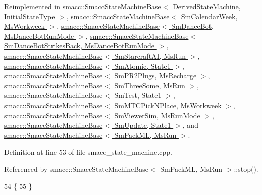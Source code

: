 Reimplemented in \hyperlink{structsmacc_1_1SmaccStateMachineBase_aaa9baa888888165998aa990ca299e30b}{smacc\+::\+Smacc\+State\+Machine\+Base$<$ Derived\+State\+Machine, Initial\+State\+Type $>$}, \hyperlink{structsmacc_1_1SmaccStateMachineBase_aaa9baa888888165998aa990ca299e30b}{smacc\+::\+Smacc\+State\+Machine\+Base$<$ Sm\+Calendar\+Week, Ms\+Workweek $>$}, \hyperlink{structsmacc_1_1SmaccStateMachineBase_aaa9baa888888165998aa990ca299e30b}{smacc\+::\+Smacc\+State\+Machine\+Base$<$ Sm\+Dance\+Bot, Ms\+Dance\+Bot\+Run\+Mode $>$}, \hyperlink{structsmacc_1_1SmaccStateMachineBase_aaa9baa888888165998aa990ca299e30b}{smacc\+::\+Smacc\+State\+Machine\+Base$<$ Sm\+Dance\+Bot\+Strikes\+Back, Ms\+Dance\+Bot\+Run\+Mode $>$}, \hyperlink{structsmacc_1_1SmaccStateMachineBase_aaa9baa888888165998aa990ca299e30b}{smacc\+::\+Smacc\+State\+Machine\+Base$<$ Sm\+Starcraft\+A\+I, Ms\+Run $>$}, \hyperlink{structsmacc_1_1SmaccStateMachineBase_aaa9baa888888165998aa990ca299e30b}{smacc\+::\+Smacc\+State\+Machine\+Base$<$ Sm\+Atomic, State1 $>$}, \hyperlink{structsmacc_1_1SmaccStateMachineBase_aaa9baa888888165998aa990ca299e30b}{smacc\+::\+Smacc\+State\+Machine\+Base$<$ Sm\+P\+R2\+Plugs, Ms\+Recharge $>$}, \hyperlink{structsmacc_1_1SmaccStateMachineBase_aaa9baa888888165998aa990ca299e30b}{smacc\+::\+Smacc\+State\+Machine\+Base$<$ Sm\+Three\+Some, Ms\+Run $>$}, \hyperlink{structsmacc_1_1SmaccStateMachineBase_aaa9baa888888165998aa990ca299e30b}{smacc\+::\+Smacc\+State\+Machine\+Base$<$ Sm\+Test, State1 $>$}, \hyperlink{structsmacc_1_1SmaccStateMachineBase_aaa9baa888888165998aa990ca299e30b}{smacc\+::\+Smacc\+State\+Machine\+Base$<$ Sm\+M\+T\+C\+Pick\+N\+Place, Ms\+Workweek $>$}, \hyperlink{structsmacc_1_1SmaccStateMachineBase_aaa9baa888888165998aa990ca299e30b}{smacc\+::\+Smacc\+State\+Machine\+Base$<$ Sm\+Viewer\+Sim, Ms\+Run\+Mode $>$}, \hyperlink{structsmacc_1_1SmaccStateMachineBase_aaa9baa888888165998aa990ca299e30b}{smacc\+::\+Smacc\+State\+Machine\+Base$<$ Sm\+Update, State1 $>$}, and \hyperlink{structsmacc_1_1SmaccStateMachineBase_aaa9baa888888165998aa990ca299e30b}{smacc\+::\+Smacc\+State\+Machine\+Base$<$ Sm\+Pack\+M\+L, Ms\+Run $>$}.



Definition at line 53 of file smacc\+\_\+state\+\_\+machine.\+cpp.



Referenced by smacc\+::\+Smacc\+State\+Machine\+Base$<$ Sm\+Pack\+M\+L, Ms\+Run $>$\+::stop().


\begin{DoxyCode}
54 \{
55 \}
\end{DoxyCode}


